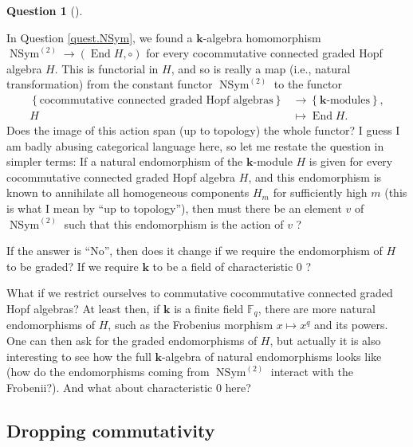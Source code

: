 \documentclass
[numbers=enddot,12pt,final,onecolumn,notitlepage,abstracton]{scrartcl}%
\theoremstyle{definition}
\newtheorem{quest}[theo]{Question}
\newenvironment{question}[1][]
{\begin{quest}[#1]\begin{leftbar}}
{\end{leftbar}\end{quest}}
\newenvironment{question}[1][Question]{\noindent\textbf{#1.} }{\ \rule{0.5em}{0.5em}}
\begin{document}
\begin{question}
\label{quest.allfunctorial}In Question \ref{quest.NSym}, we found a
$\mathbf{k}$-algebra homomorphism $\operatorname*{NSym}\nolimits^{\left(
2\right)  }\rightarrow\left(  \operatorname*{End}H,\circ\right)  $ for every
cocommutative connected graded Hopf algebra $H$. This is functorial in $H$,
and so is really a map (i.e., natural transformation) from the constant
functor $\operatorname*{NSym}\nolimits^{\left(  2\right)  }$ to the functor%
\begin{align*}
\left\{  \text{cocommutative connected graded Hopf algebras}\right\}   &
\rightarrow\left\{  \mathbf{k}\text{-modules}\right\}  ,\\
H  &  \mapsto\operatorname*{End}H.
\end{align*}
Does the image of this action span (up to topology) the whole functor? I guess
I am badly abusing categorical language here, so let me restate the question
in simpler terms: If a natural endomorphism of the $\mathbf{k}$-module $H$ is
given for every cocommutative connected graded Hopf algebra $H$, and this
endomorphism is known to annihilate all homogeneous components $H_{m}$ for
sufficiently high $m$ (this is what I mean by \textquotedblleft up to
topology\textquotedblright), then must there be an element $v$ of
$\operatorname*{NSym}\nolimits^{\left(  2\right)  }$ such that this
endomorphism is the action of $v$ ?

If the answer is \textquotedblleft No\textquotedblright, then does it change
if we require the endomorphism of $H$ to be graded? If we require $\mathbf{k}$
to be a field of characteristic $0$ ?

What if we restrict ourselves to commutative cocommutative connected graded
Hopf algebras? At least then, if $\mathbf{k}$ is a finite field $\mathbb{F}%
_{q}$, there are more natural endomorphisms of $H$, such as the Frobenius
morphism $x\mapsto x^{q}$ and its powers. One can then ask for the graded
endomorphisms of $H$, but actually it is also interesting to see how the full
$\mathbf{k}$-algebra of natural endomorphisms looks like (how do the
endomorphisms coming from $\operatorname*{NSym}\nolimits^{\left(  2\right)  }$
interact with the Frobenii?). And what about characteristic $0$ here?
\end{question}

\subsection{Dropping commutativity}
\end{document}
